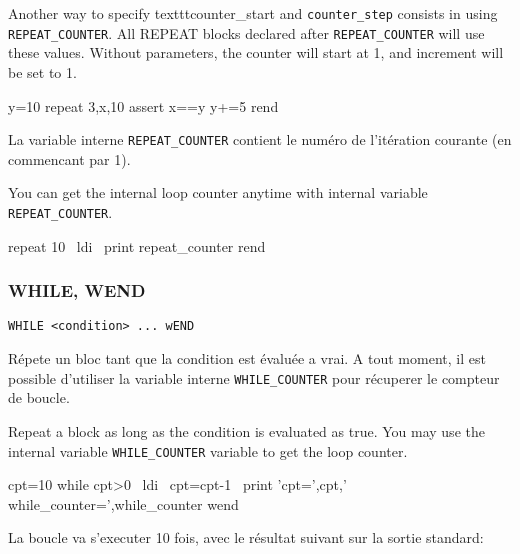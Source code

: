 \begin{xen}
Another way to specify texttt{counter\_start} and \texttt{counter\_step}  consists in using \texttt{REPEAT\_COUNTER}.
All REPEAT blocks declared after \texttt{REPEAT\_COUNTER} will use these values.
Without parameters, the counter will start at 1, and increment will be set to 1.
\end{xen}

\begin{code}
y=10
repeat 3,x,10
  assert x==y
  y+=5
rend
\end{code}
    
\begin{xfr}
La variable interne \texttt{REPEAT\_COUNTER} contient le numéro de l'itération courante (en commencant par 1).
\end{xfr}
\begin{xen}
You can get the internal loop counter anytime with internal variable \texttt{REPEAT\_COUNTER}.
\end{xen}

\begin{code}
repeat 10
\ ldi
\ print repeat\_counter
rend
\end{code}

    


\subsubsection{WHILE, WEND}
\begin{verbatim}
WHILE <condition> ... wEND
\end{verbatim}

\begin{xfr}
Répete un bloc tant que la condition est évaluée a vrai. A tout moment, il est possible d'utiliser la variable interne \texttt{WHILE\_COUNTER} pour récuperer le compteur de boucle.
\end{xfr}

\begin{xen}
Repeat a block as long as the condition is evaluated as true. You may use the internal variable \texttt{WHILE\_COUNTER} variable to get the loop counter.
\end{xen}

\begin{code}
cpt=10
while cpt\textgreater 0
\ ldi
\ cpt=cpt-1
\ print 'cpt=',cpt,' while\_counter=',while\_counter
wend
\end{code}

\begin{xfr}
La boucle va s'executer 10 fois, avec le résultat suivant sur la sortie standard:
\end{xfr}

